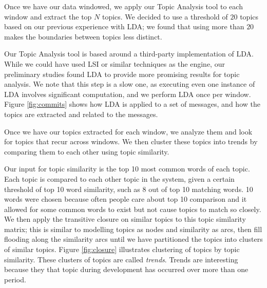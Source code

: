 \documentclass[times, 10pt,twocolumn]{article}
\newcommand{\shrinkit}{\vspace*{-.3em}}
\begin{document}
\shrinkit
{}
\shrinkit

Once we have our data windowed, we apply our Topic Analysis tool to
each window and extract the top $N$ topics.  We decided to use a
threshold of $20$ topics based on our previous experience with LDA; we
found that using more than $20$ makes the boundaries between topics less
distinct.


Our Topic Analysis tool is based around a third-party implementation
of LDA.  While we could have used LSI or similar techniques as the
engine, our preliminary studies found LDA to provide more promising
results for topic analysis.  We note that this step is a slow one, as
executing even one instance of LDA involves significant computation,
and we perform LDA once per window.  Figure \ref{fig:commits} shows
how LDA is applied to a set of messages, and how the topics are
extracted and related to the messages.





\shrinkit
{}
\shrinkit


Once we have our topics extracted for each window, we analyze them and
look for topics that recur across windows.  We then cluster these
topics into trends by comparing them to each other using topic similarity.

Our input for topic similarity is the top 10 most common words of each
topic.  Each topic is compared to each other topic in the system,
given a certain threshold of top 10 word similarity, such as 8 out of
top 10 matching words.  10 words were chosen because often people care
about top 10 comparison and it allowed for some common words to exist
but not cause topics to match so closely.  We then apply the
transitive closure on similar topics to this topic similarity matrix;
this is similar to modelling topics as nodes and similarity as arcs,
then fill flooding along the similarity arcs until we have partitioned
the topics into clusters of similar topics. Figure \ref{fig:closure}
illustrates clustering of topics by topic similarity. These clusters
of topics are called \emph{trends}. 
Trends are interesting because they that topic during development has occurred over more than one period.
\end{document}
